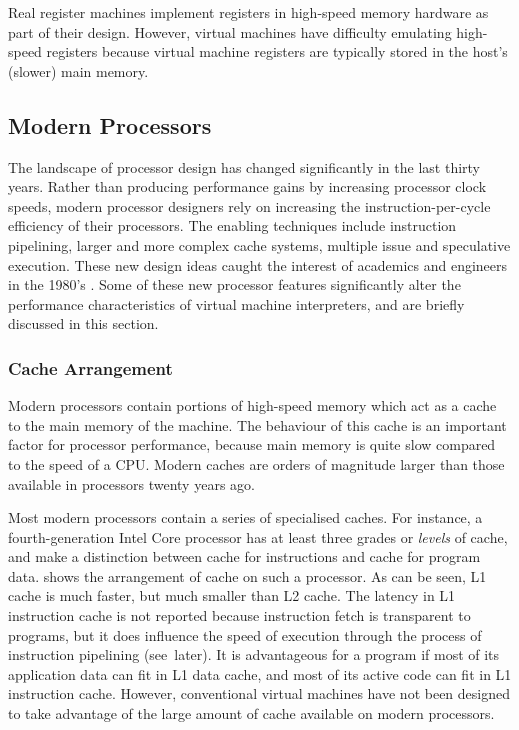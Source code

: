 			Real register machines implement registers in high-speed memory hardware as part of their design. However, virtual machines have difficulty emulating high-speed registers because virtual machine registers are typically stored in the host's (slower) main memory.
			
			
		\subsection{Modern Processors}
			The landscape of processor design has changed significantly in the last thirty years. Rather than producing performance gains by increasing processor clock speeds, modern processor designers rely on increasing the instruction-per-cycle efficiency of their processors. The enabling techniques include instruction pipelining, larger and more complex cache systems, multiple issue and speculative execution. These new design ideas caught the interest of academics and engineers in the 1980's \citep{modernprocessordesign}. Some of these new processor features significantly alter the performance characteristics of virtual machine interpreters, and are briefly discussed in this section.
			
			\subsubsection{Cache Arrangement}
			Modern processors contain portions of high-speed memory which act as a cache to the main memory of the machine. The behaviour of this cache is an important factor for processor performance, because main memory is quite slow compared to the speed of a CPU. Modern caches are orders of magnitude larger than those available in processors twenty years ago. 
			
			Most modern processors contain a series of specialised caches. For instance, a fourth-generation Intel Core processor has at least three grades or \emph{levels} of cache, and make a distinction between cache for instructions and cache for program data.  shows the arrangement of cache on such a processor. As can be seen, L1 cache is much faster, but much smaller than L2 cache. The latency in L1 instruction cache is not reported because instruction fetch is transparent to programs, but it does influence the speed of execution through the process of instruction pipelining (see~later). It is advantageous for a program if most of its application data can fit in L1 data cache, and most of its active code can fit in L1 instruction cache. However, conventional virtual machines have not been designed to take advantage of the large amount of cache available on modern processors.
			
